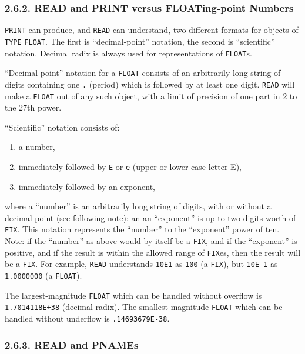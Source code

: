 \documentclass[a4paper,]{article}
\begin{document}
\subsubsection{2.6.2. READ and PRINT versus FLOATing-point Numbers}\label{read-and-print-versus-floating-point-numbers}

\texttt{PRINT} can produce, and \texttt{READ} can understand, two different formats for objects of
\texttt{TYPE} \texttt{FLOAT}. The first is ``decimal-point'' notation, the second is
``scientific'' notation. Decimal radix is always used for representations of \texttt{FLOAT}s.

``Decimal-point'' notation for a \texttt{FLOAT} consists of an arbitrarily long string of digits containing one \texttt{.}
(period) which is followed by at least one digit. \texttt{READ} will make a \texttt{FLOAT} out of any such object, with a
limit of precision of one part in 2 to the 27th power.

``Scientific'' notation consists of:

\begin{enumerate}
\def\labelenumi{\arabic{enumi}.}
\item
  a number,
\item
  immediately followed by \texttt{E} or \texttt{e} (upper or lower case letter E),
\item
  immediately followed by an exponent,
\end{enumerate}

where a ``number'' is an arbitrarily long string of digits, with or without a decimal point (see following note): an an
``exponent'' is up to two digits worth of \texttt{FIX}. This notation represents the ``number'' to the
``exponent'' power of ten. Note: if the ``number'' as above would by itself be a \texttt{FIX}, and if the ``exponent'' is
positive, and if the result is within the allowed range of \texttt{FIX}es, then the result will be a \texttt{FIX}. For
example, \texttt{READ} understands \texttt{10E1} as \texttt{100} (a \texttt{FIX}), but \texttt{10E-1} as \texttt{1.0000000}
(a \texttt{FLOAT}).

The largest-magnitude \texttt{FLOAT} which can be handled without overflow is \texttt{1.7014118E+38} (decimal radix). The
smallest-magnitude \texttt{FLOAT} which can be handled without underflow is \texttt{.14693679E-38}.

\subsubsection{2.6.3. READ and PNAMEs}\label{read-and-pnames}
\end{document}
